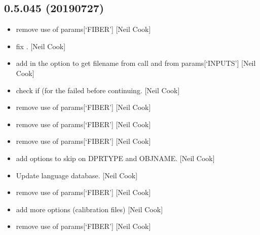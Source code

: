 \documentclass[a4paper,10pt,english]{report}
\begin{document}
\subsection{0.5.045 (2019\sphinxhyphen{}07\sphinxhyphen{}27)}
\label{\detokenize{misc/changelog:id117}}\begin{itemize}
\item {} 
 \sphinxhyphen{} remove use of params{[}‘FIBER’{]} {[}Neil
Cook{]}

\item {} 
 \sphinxhyphen{} fix . {[}Neil Cook{]}

\item {} 
 \sphinxhyphen{} add in the option to get filename from call and from
params{[}‘INPUTS’{]} {[}Neil Cook{]}

\item {} 
 \sphinxhyphen{} check if  (for the 
failed before continuing. {[}Neil Cook{]}

\item {} 
 \sphinxhyphen{} remove use of params{[}‘FIBER’{]} {[}Neil Cook{]}

\item {} 
 \sphinxhyphen{} remove use of params{[}‘FIBER’{]} {[}Neil Cook{]}

\item {} 
 \sphinxhyphen{} remove use of params{[}‘FIBER’{]} {[}Neil Cook{]}

\item {} 
 \sphinxhyphen{} add options to skip on DPRTYPE and OBJNAME.
{[}Neil Cook{]}

\item {} 
Update language database. {[}Neil Cook{]}

\item {} 
 \sphinxhyphen{} remove use of params{[}‘FIBER’{]} {[}Neil Cook{]}

\item {} 
 \sphinxhyphen{} add more options (calibration files) {[}Neil
Cook{]}

\item {} 
 \sphinxhyphen{} remove use of params{[}‘FIBER’{]} {[}Neil Cook{]}


\end{itemize}
\end{document}
